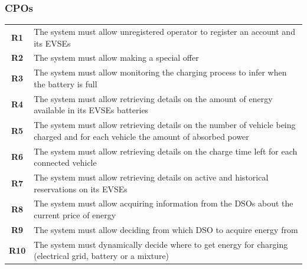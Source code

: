 \subsubsection{CPOs}
\begin{table}[H]
    \begin{tabularx}{\textwidth}{cX}
        \toprule
        \textbf{R1}  & The system must allow unregistered operator to register an account and its EVSEs                                                  \\
        \textbf{R2}  & The system must allow making a special offer                                                                                      \\
        \textbf{R3}  & The system must allow monitoring the charging process to infer when the battery is full                                           \\
        \textbf{R4}  & The system must allow retrieving details on the amount of energy available in its EVSEs batteries                                 \\
        \textbf{R5}  & The system must allow retrieving details on the number of vehicle being charged and for each vehicle the amount of absorbed power \\
        \textbf{R6}  & The system must allow retrieving details on the charge time left for each connected vehicle                                       \\
        \textbf{R7}  & The system must allow retrieving details on active and historical reservations on its EVSEs                                       \\
        \textbf{R8}  & The system must allow acquiring information from the DSOs about the current price of energy                                       \\
        \textbf{R9}  & The system must allow deciding from which DSO to acquire energy from                                                              \\
        \textbf{R10} & The system must dynamically decide where to get energy for charging (electrical grid, battery or a mixture)                       \\ \bottomrule
    \end{tabularx}
\end{table}
